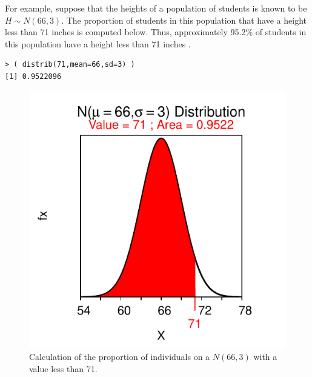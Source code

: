 \documentclass[10pt,openany]{book}\usepackage[]{graphicx}\usepackage[]{color}
\makeatletter
\newenvironment{kframe}{%
 \def\at@end@of@kframe{}%
 \ifinner\ifhmode%
  \def\at@end@of@kframe{\end{minipage}}%
  \begin{minipage}{\columnwidth}%
 \fi\fi%
 \def\FrameCommand##1{\hskip\@totalleftmargin \hskip-\fboxsep
 \colorbox{shadecolor}{##1}\hskip-\fboxsep
     \hskip-\linewidth \hskip-\@totalleftmargin \hskip\columnwidth}%
 \MakeFramed {\advance\hsize-\width
   \@totalleftmargin\z@ \linewidth\hsize
   \@setminipage}}%
 {\par\unskip\endMakeFramed%
 \at@end@of@kframe}
\newenvironment{knitrout}{}{} %
\makeatother
\begin{document}
For example, suppose that the heights of a population of students is known to be $H\sim N(66,3)$. The proportion of students in this population that have a height less than 71 inches is computed below. Thus, approximately 95.2\% of students in this population have a height less than 71 inches .
\begin{knitrout}
\color{fgcolor}\begin{kframe}
\begin{verbatim}
> ( distrib(71,mean=66,sd=3) )
[1] 0.9522096
\end{verbatim}
\end{kframe}\begin{figure}[hbtp]

{\centering \includegraphics[width=.4\linewidth]{Figs/NormZCalc1-1} 

}

\caption[Calculation of the proportion of individuals on a $N(66,3)$ with a value less than 71]{Calculation of the proportion of individuals on a $N(66,3)$ with a value less than 71.}\label{fig:NormZCalc1}
\end{figure}


\end{knitrout}
\end{document}
